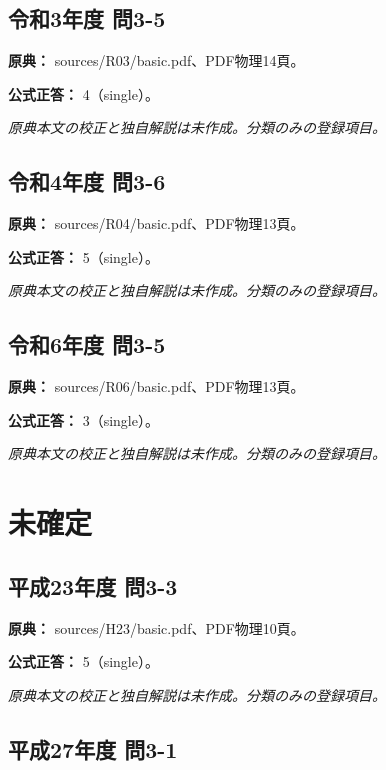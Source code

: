 \subsection{令和3年度 問3-5}
\label{q:r03-reg-basic-3-5}

\noindent\textbf{原典：} sources/R03/basic.pdf、PDF物理14頁。

\textbf{公式正答：} 4（single）。

\par\textit{原典本文の校正と独自解説は未作成。分類のみの登録項目。}

\subsection{令和4年度 問3-6}
\label{q:r04-reg-basic-3-6}

\noindent\textbf{原典：} sources/R04/basic.pdf、PDF物理13頁。

\textbf{公式正答：} 5（single）。

\par\textit{原典本文の校正と独自解説は未作成。分類のみの登録項目。}

\subsection{令和6年度 問3-5}
\label{q:r06-reg-basic-3-5}

\noindent\textbf{原典：} sources/R06/basic.pdf、PDF物理13頁。

\textbf{公式正答：} 3（single）。

\par\textit{原典本文の校正と独自解説は未作成。分類のみの登録項目。}

\section{未確定}

\subsection{平成23年度 問3-3}
\label{q:h23-reg-basic-3-3}

\noindent\textbf{原典：} sources/H23/basic.pdf、PDF物理10頁。

\textbf{公式正答：} 5（single）。

\par\textit{原典本文の校正と独自解説は未作成。分類のみの登録項目。}

\subsection{平成27年度 問3-1}
\label{q:h27-reg-basic-3-1}

